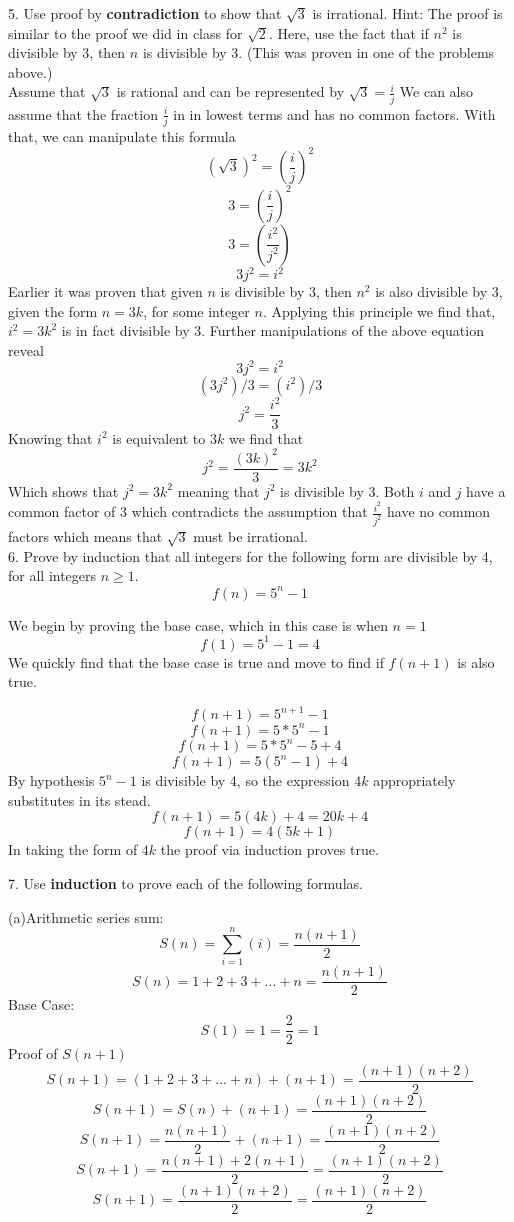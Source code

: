\documentclass[10pt]{article}
\begin{document}
5. Use proof by \textbf{contradiction} to show that $\sqrt{3}$ is irrational.
Hint: The proof is similar to the proof we did in class for $\sqrt{2}$.  Here, use the fact that if $n^2$ is divisible by 3, then $n$ is divisible by 3. (This was proven in one of the problems above.)\\
Assume that $\sqrt{3}$ is rational and can be represented by $\sqrt{3} = \frac{i}{j}$  We can also assume that the fraction $\frac{i}{j}$ in in lowest terms and has no common factors.  With that, we can manipulate this formula
$$ (\sqrt{3})^2 = (\frac{i}{j})^2$$ 
$$3 = (\frac{i}{j})^2$$ 
$$3 = (\frac{i^2}{j^2})$$
$$3j^2 = i^2$$
Earlier it was proven that given $n$ is divisible by 3, then $n^2$ is also divisible by 3, given the form
$n = 3k$, for some integer $n$.  Applying this principle we find that, $i^2 = 3k^2$ is in fact divisible by 3.  Further manipulations of the above equation reveal
$$3j^2 = i^2$$
$$(3j^2)/3 = (i^2)/3$$
$$j^2 = \frac{i^2}{3}$$
Knowing that $i^2$ is equivalent to $3k$ we find that
$$j^2 = \frac{(3k)^2}{3} = 3k^2$$
Which shows that $j^2 = 3k^2$ meaning that $j^2$ is divisible by 3.  Both $i$ and $j$ have a common factor of 3 which contradicts the assumption that $\frac{i^2}{j^2}$ have no common factors which means that $\sqrt{3}$ must be irrational.\\

6. Prove by induction that all integers for the following form are divisible by 4, for all integers $n \geq 1$.
$$f(n) = 5^n - 1$$

We begin by proving the base case, which in this case is when $n = 1$
$$f(1) = 5^1 - 1 = 4$$
We quickly find that the base case is true and move to find if $f(n+1)$ is also true.

$$f(n+1) = 5^{n+1} - 1$$
$$f(n+1) = 5 * 5^n - 1$$
$$f(n+1) = 5 * 5^n - 5 + 4$$
$$f(n+1) = 5(5^n - 1) + 4$$
By hypothesis $5^n - 1$ is divisible by 4, so the expression $4k$ appropriately substitutes in its stead.
$$f(n+1) = 5(4k) + 4 = 20k + 4$$
$$f(n+1) = 4(5k + 1)$$
In taking the form of $4k$ the proof via induction proves true.

7. Use \textbf{induction} to prove each of the following formulas.

(a)Arithmetic series sum:
$$S(n) = \sum\limits_{i=1}^n(i) = \frac{n(n +1)}{2}$$
$$S(n) = 1 + 2 + 3 + ... + n = \frac{n(n +1)}{2}$$
Base Case:
$$S(1) = 1 = \frac{2}{2} = 1$$
Proof of $S(n+1)$
$$S(n+1) = (1 + 2 + 3 + ... + n) + (n + 1) = \frac{(n + 1)(n + 2)}{2}$$
$$S(n+1) = S(n) + (n + 1) = \frac{(n + 1)(n + 2)}{2}$$
$$S(n+1) = \frac{n(n + 1)}{2} + (n + 1) = \frac{(n + 1)(n + 2)}{2}$$
$$S(n+1) = \frac{n(n + 1) + 2(n + 1)}{2} = \frac{(n + 1)(n + 2)}{2}$$
$$S(n+1) = \frac{(n + 1)(n + 2)}{2} = \frac{(n + 1)(n + 2)}{2}$$
\end{document}
